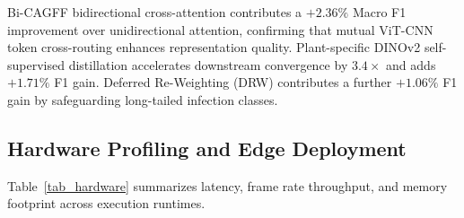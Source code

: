 \documentclass[runningheads]{llncs}
\begin{document}
\begin{table}[!htbp]
\centering
\caption{Ablation analysis of individual architectural components.}
\label{tab_ablation}
\end{table}

Bi-CAGFF bidirectional cross-attention contributes a $+2.36\%$ Macro F1 improvement over unidirectional attention, confirming that mutual ViT-CNN token cross-routing enhances representation quality. Plant-specific DINOv2 self-supervised distillation accelerates downstream convergence by $3.4\times$ and adds $+1.71\%$ F1 gain. Deferred Re-Weighting (DRW) contributes a further $+1.06\%$ F1 gain by safeguarding long-tailed infection classes.

\subsection{Hardware Profiling and Edge Deployment}
Table~\ref{tab_hardware} summarizes latency, frame rate throughput, and memory footprint across execution runtimes.
\end{document}
